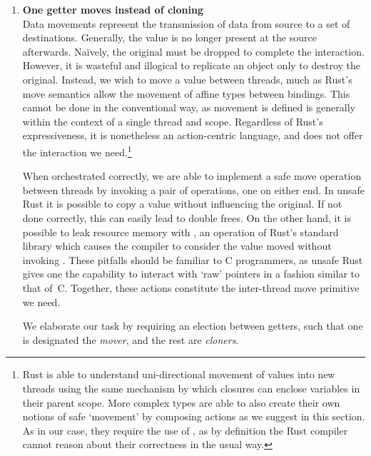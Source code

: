 \begin{enumerate}
	\item \textbf{One getter moves instead of cloning}\\
	Data movements represent the transmission of data from source to a set of destinations. Generally, the value is no longer present at the source afterwards. Na\"ively, the original must be dropped to complete the interaction. However, it is wasteful and illogical to replicate an object only to destroy the original. Instead, we wish to move a value between threads, much as Rust's move semantics allow the movement of affine types between bindings. This cannot be done in the conventional way, as movement is defined is generally within the context of a single thread and scope. Regardless of Rust's expressiveness, it is nonetheless an action-centric language, and does not offer the interaction we need.\footnote{Rust is able to understand uni-directional movement of values into new threads using the same mechanism by which closures can enclose variables in their parent scope. More complex types are able to also create their own notions of safe `movement' by composing actions as we suggest in this section. As in our case, they require the use of , as by definition the Rust compiler cannot reason about their correctness in the usual way.} 
	
	When orchestrated correctly, we are able to implement a safe move operation between threads by invoking a pair of  operations, one on either end. In unsafe Rust it is possible to copy a value without influencing the original. If not done correctly, this can easily lead to double frees. On the other hand, it is possible to leak resource memory with , an operation of Rust's standard library which causes the compiler to consider the value moved without invoking . These pitfalls should be familiar to C programmers, as unsafe Rust gives one the capability to interact with `raw' pointers in a fashion similar to that of~C. Together, these actions constitute the inter-thread move primitive we need.
	
	We elaborate our task by requiring an election between getters, such that one is designated the \textit{mover}, and the rest are \textit{cloners}. 
	

\end{enumerate}

